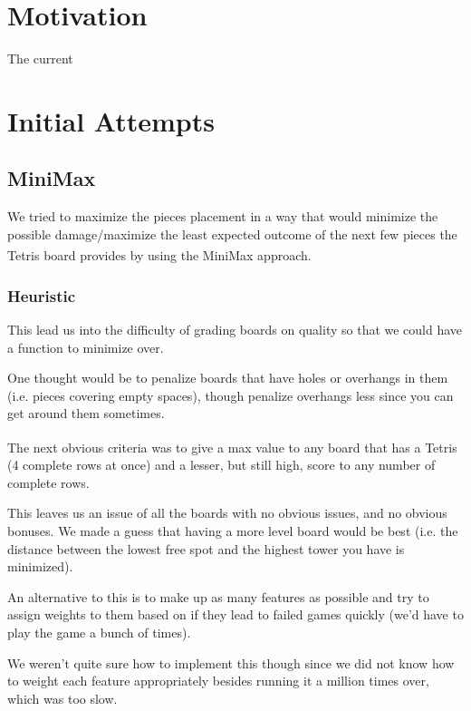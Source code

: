 \documentclass[ fontsize=11pt]{article}
\def\tetris{Tetris\textsuperscript{\textregistered}}
\begin{document}
\section{Motivation}
\label{sec:motivation}
The current


\section{Initial Attempts}
\label{sec:initial_attempts}

\subsection{MiniMax}
\par We tried to maximize the pieces placement in a way that would minimize the possible damage/maximize the least expected outcome of the next few pieces the \tetris{} board provides by using the MiniMax approach.
\subsubsection{Heuristic}
\par This lead us into the difficulty of grading boards on quality so that we could have a function to minimize over.

\par One thought would be to penalize boards that have holes or overhangs in them (i.e. pieces covering empty spaces), though penalize overhangs less since you can get around them sometimes.

\par The next obvious criteria was to give a max value to any board that has a \tetris{} (4 complete rows at once) and a lesser, but still high, score to any number of complete rows.

\par This leaves us an issue of all the boards with no obvious issues, and no obvious bonuses. We made a guess that having a more level board would be best (i.e. the distance between the lowest free spot and the highest tower you have is minimized).

\par An alternative to this is to make up as many features as possible and try to assign weights to them based on if they lead to failed games quickly (we'd have to play the game a bunch of times).

\par We weren't quite sure how to implement this though since we did not know how to weight each feature appropriately besides running it a million times over, which was too slow.
\end{document}
